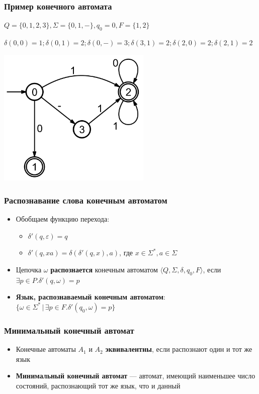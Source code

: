 \documentclass{beamer}
\begin{document}
\begin{frame}[fragile]
  \transwipe[direction=90]
  \frametitle{Пример конечного автомата}

 $Q = \{ 0, 1, 2, 3\}, \Sigma = \{ 0, 1, -\}, q_0 = 0, F = \{1, 2\}$
 
 $\delta (0, 0) = 1; \delta (0, 1) = 2; \delta (0, -) = 3; \delta (3, 1) = 2; \delta (2, 0) = 2; \delta (2, 1) = 2 $ 

  \begin{center}
     \includegraphics[width=0.55\textwidth]{pics/automaton.png}  
   \end{center}
\end{frame}


\begin{frame}[fragile]
  \transwipe[direction=90]
  \frametitle{Распознавание слова конечным автоматом}
  \begin{itemize}
    \item  Обобщаем функцию перехода: 
    \begin{itemize}
      \item $\delta' (q, \varepsilon) = q$
      \item $\delta' (q, xa) = \delta(\delta'(q, x), a)$, где $x \in \Sigma^*, a \in \Sigma$
    \end{itemize}
    \item Цепочка $\omega$ \textbf{распознается} конечным автоматом $\langle Q, \Sigma, \delta, q_0, F \rangle$, если $\exists p \in P. \delta'(q, \omega) = p$
    \item \textbf{Язык, распознаваемый конечным автоматом}: $\{ \omega \in \Sigma^* \, | \, \exists p \in F.\delta'(q_0, \omega) = p \}$
  \end{itemize}
\end{frame}

\begin{frame}[fragile]
  \transwipe[direction=90]
  \frametitle{Минимальный конечный автомат}
  \begin{itemize}
    \item Конечные автоматы $A_1$ и $A_2$ \textbf{эквивалентны}, если распознают один и тот же язык
    \item \textbf{Минимальный конечный автомат} --- автомат, имеющий наименьшее число состояний, распознающий тот же язык, что и данный
  \end{itemize}
\end{frame}
\end{document}
